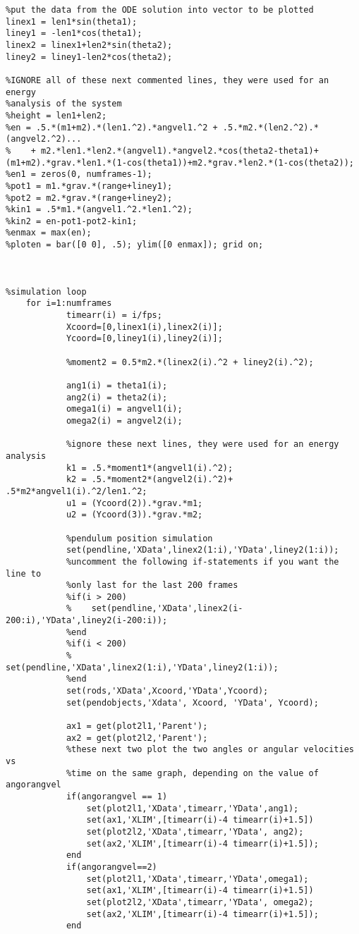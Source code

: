 \documentclass[11]{article}
\begin{document}
\begin{verbatim}
%put the data from the ODE solution into vector to be plotted
linex1 = len1*sin(theta1);
liney1 = -len1*cos(theta1);
linex2 = linex1+len2*sin(theta2);
liney2 = liney1-len2*cos(theta2);

%IGNORE all of these next commented lines, they were used for an energy
%analysis of the system
%height = len1+len2;
%en = .5.*(m1+m2).*(len1.^2).*angvel1.^2 + .5.*m2.*(len2.^2).*(angvel2.^2)...
%    + m2.*len1.*len2.*(angvel1).*angvel2.*cos(theta2-theta1)+(m1+m2).*grav.*len1.*(1-cos(theta1))+m2.*grav.*len2.*(1-cos(theta2));
%en1 = zeros(0, numframes-1);
%pot1 = m1.*grav.*(range+liney1);
%pot2 = m2.*grav.*(range+liney2);
%kin1 = .5*m1.*(angvel1.^2.*len1.^2);
%kin2 = en-pot1-pot2-kin1;
%enmax = max(en);
%ploten = bar([0 0], .5); ylim([0 enmax]); grid on;



%simulation loop
    for i=1:numframes
            timearr(i) = i/fps;
            Xcoord=[0,linex1(i),linex2(i)];
            Ycoord=[0,liney1(i),liney2(i)];
            
            %moment2 = 0.5*m2.*(linex2(i).^2 + liney2(i).^2);
            
            ang1(i) = theta1(i);
            ang2(i) = theta2(i);
            omega1(i) = angvel1(i);
            omega2(i) = angvel2(i);
            
            %ignore these next lines, they were used for an energy analysis
            k1 = .5.*moment1*(angvel1(i).^2);
            k2 = .5.*moment2*(angvel2(i).^2)+ .5*m2*angvel1(i).^2/len1.^2;
            u1 = (Ycoord(2)).*grav.*m1;
            u2 = (Ycoord(3)).*grav.*m2;
            
            %pendulum position simulation
            set(pendline,'XData',linex2(1:i),'YData',liney2(1:i));
            %uncomment the following if-statements if you want the line to
            %only last for the last 200 frames
            %if(i > 200)
            %    set(pendline,'XData',linex2(i-200:i),'YData',liney2(i-200:i));
            %end
            %if(i < 200)
            %    set(pendline,'XData',linex2(1:i),'YData',liney2(1:i));
            %end
            set(rods,'XData',Xcoord,'YData',Ycoord);
            set(pendobjects,'Xdata', Xcoord, 'YData', Ycoord);
            
            ax1 = get(plot2l1,'Parent');
            ax2 = get(plot2l2,'Parent');
            %these next two plot the two angles or angular velocities vs
            %time on the same graph, depending on the value of angorangvel
            if(angorangvel == 1)
                set(plot2l1,'XData',timearr,'YData',ang1);
                set(ax1,'XLIM',[timearr(i)-4 timearr(i)+1.5])
                set(plot2l2,'XData',timearr,'YData', ang2);
                set(ax2,'XLIM',[timearr(i)-4 timearr(i)+1.5]);
            end
            if(angorangvel==2)
                set(plot2l1,'XData',timearr,'YData',omega1);
                set(ax1,'XLIM',[timearr(i)-4 timearr(i)+1.5])
                set(plot2l2,'XData',timearr,'YData', omega2);
                set(ax2,'XLIM',[timearr(i)-4 timearr(i)+1.5]);
            end
            

\end{verbatim}
\end{document}
